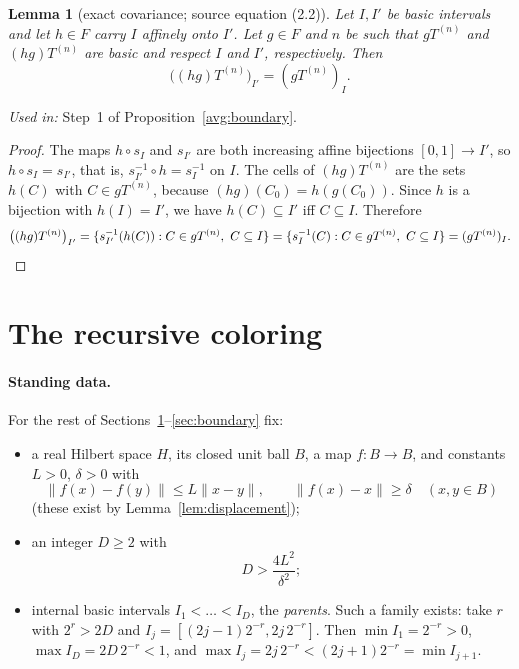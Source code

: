 \documentclass[11pt]{article}
\newcommand{\norm}[1]{\lVert #1\rVert}
\newtheorem{lemma}[theorem]{Lemma}
\theoremstyle{definition}
\numberwithin{equation}{section}
\begin{document}
\begin{lemma}[exact covariance; source equation (2.2)]\label{dyad:covariance}
Let \(I,I'\) be basic intervals and let \(h\in F\) carry \(I\) affinely
onto \(I'\). Let \(g\in F\) and \(n\) be such that \(gT^{(n)}\) and
\((hg)T^{(n)}\) are basic and respect \(I\) and \(I'\), respectively.
Then
\begin{equation}\label{dyad:covariance-eq}
  \bigl((hg)T^{(n)}\bigr)_{I'}=(gT^{(n)})_I .
\end{equation}
\end{lemma}
\noindent\emph{Used in:} Step~1 of Proposition~\ref{avg:boundary}.

\begin{proof}
The maps \(h\circ s_I\) and \(s_{I'}\) are both increasing affine
bijections \([0,1]\to I'\), so \(h\circ s_I=s_{I'}\), that is,
\(s_{I'}^{-1}\circ h=s_I^{-1}\) on \(I\). The cells of \((hg)T^{(n)}\) are
the sets \(h(C)\) with \(C\in gT^{(n)}\), because \((hg)(C_0)=h(g(C_0))\).
Since \(h\) is a bijection with \(h(I)=I'\), we have \(h(C)\subseteq I'\)
iff \(C\subseteq I\). Therefore
\[
  \bigl((hg)T^{(n)}\bigr)_{I'}
  =\{s_{I'}^{-1}(h(C)):C\in gT^{(n)},\ C\subseteq I\}
  =\{s_I^{-1}(C):C\in gT^{(n)},\ C\subseteq I\}
  =(gT^{(n)})_I.\qedhere
\]
\end{proof}

\section{The recursive coloring}\label{sec:coloring}

\paragraph{Standing data.} For the rest of
Sections~\ref{sec:coloring}--\ref{sec:boundary} fix:
\begin{itemize}
\item a real Hilbert space \(H\), its closed unit ball \(B\), a map
\(f:B\to B\), and constants \(L>0\), \(\delta>0\) with
\begin{equation}\label{color:map}
  \norm{f(x)-f(y)}\le L\norm{x-y},\qquad
  \norm{f(x)-x}\ge\delta
  \quad(x,y\in B)
\end{equation}
(these exist by Lemma~\ref{lem:displacement});
\item an integer \(D\ge2\) with
\begin{equation}\label{color:parameters}
  D>\frac{4L^2}{\delta^2};
\end{equation}
\item internal basic intervals \(I_1<\dots<I_D\), the \emph{parents}.
Such a family exists: take \(r\) with \(2^r>2D\) and
\(I_j=[(2j-1)2^{-r},2j\,2^{-r}]\). Then \(\min I_1=2^{-r}>0\),
\(\max I_D=2D\,2^{-r}<1\), and
\(\max I_j=2j\,2^{-r}<(2j+1)2^{-r}=\min I_{j+1}\).
\end{itemize}
\end{document}
